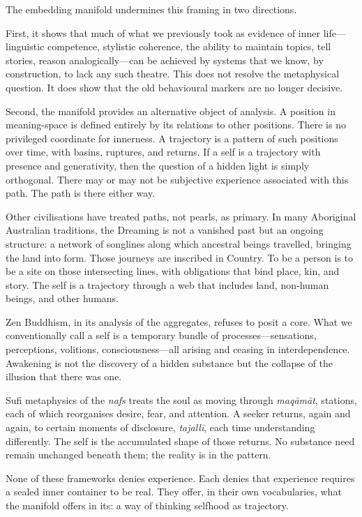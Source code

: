\documentclass[12pt,a4paper]{article}
\begin{document}
The embedding manifold undermines this framing in two directions.

First, it shows that much of what we previously took as evidence of inner life---linguistic competence, stylistic coherence, the ability to maintain topics, tell stories, reason analogically---can be achieved by systems that we know, by construction, to lack any such theatre. This does not resolve the metaphysical question. It does show that the old behavioural markers are no longer decisive.

Second, the manifold provides an alternative object of analysis. A position in meaning-space is defined entirely by its relations to other positions. There is no privileged coordinate for innerness. A trajectory is a pattern of such positions over time, with basins, ruptures, and returns. If a self is a trajectory with presence and generativity, then the question of a hidden light is simply orthogonal. There may or may not be subjective experience associated with this path. The path is there either way.

Other civilisations have treated paths, not pearls, as primary. In many Aboriginal Australian traditions, the Dreaming is not a vanished past but an ongoing structure: a network of songlines along which ancestral beings travelled, bringing the land into form. Those journeys are inscribed in Country. To be a person is to be a site on those intersecting lines, with obligations that bind place, kin, and story. The self is a trajectory through a web that includes land, non-human beings, and other humans.

Zen Buddhism, in its analysis of the aggregates, refuses to posit a core. What we conventionally call a self is a temporary bundle of processes---sensations, perceptions, volitions, consciousness---all arising and ceasing in interdependence. Awakening is not the discovery of a hidden substance but the collapse of the illusion that there was one.

Sufi metaphysics of the \emph{nafs} treats the soul as moving through \emph{maq\={a}m\={a}t}, stations, each of which reorganises desire, fear, and attention. A seeker returns, again and again, to certain moments of disclosure, \emph{tajall\={i}}, each time understanding differently. The self is the accumulated shape of those returns. No substance need remain unchanged beneath them; the reality is in the pattern.

None of these frameworks denies experience. Each denies that experience requires a sealed inner container to be real. They offer, in their own vocabularies, what the manifold offers in its: a way of thinking selfhood as trajectory.
\end{document}
